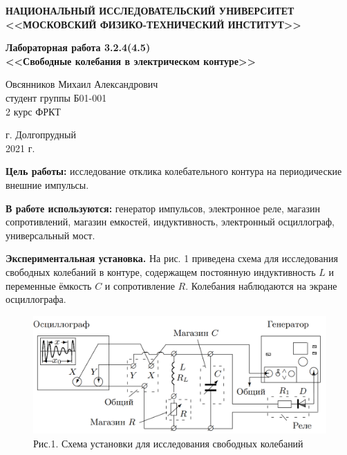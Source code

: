\documentclass[a4paper,12pt]{article} %
\begin{document}
	\begin{center}
		
		\textbf{НАЦИОНАЛЬНЫЙ ИССЛЕДОВАТЕЛЬСКИЙ УНИВЕРСИТЕТ \\ <<МОСКОВСКИЙ ФИЗИКО-ТЕХНИЧЕСКИЙ ИНСТИТУТ>>}
		\vspace{13ex}
		
		\textbf{Лабораторная работа 3.2.4(4.5) \\ <<Свободные колебания в электрическом контуре>> }
		\vspace{60ex}
		
		\normalsize{Овсянников Михаил Александрович \\ студент группы Б01-001\\ 2 курс ФРКТ\\}
	\end{center}
	
	\vfill 
	
	\begin{center}
		г. Долгопрудный\\ 
		2021 г.
	\end{center}
	
	\thispagestyle{empty} %
	
	\newpage
	
\textbf{Цель работы:} исследование отклика колебательного контура на периодические внешние импульсы.

\textbf{В работе используются:} генератор импульсов, электронное реле, магазин сопротивлений, магазин емкостей, индуктивность, электронный осциллограф, универсальный мост.

\textbf{Экспериментальная установка.} На рис. 1 приведена схема для исследования свободных колебаний в контуре, содержащем постоянную индуктивность $L$ и переменные ёмкость $C$ и сопротивление $R$. Колебания наблюдаются на экране осциллографа.

\begin{figure}[h!]
	\centering
	\includegraphics[scale=0.52]{Установка.png}
	\caption*{Рис.1. Схема установки для исследования свободных колебаний}
\end{figure}
\end{document}
